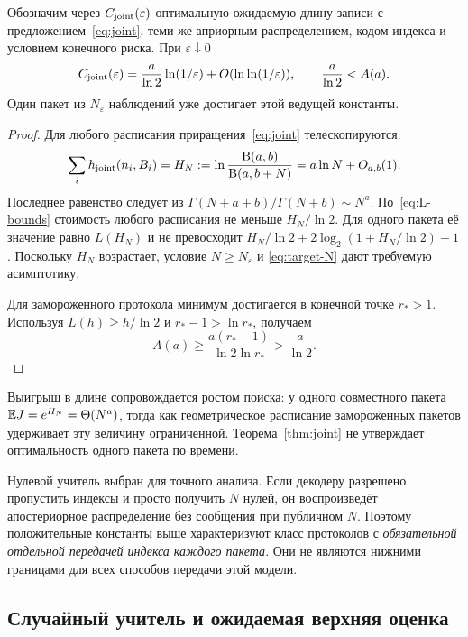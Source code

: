 \begin{theorem}
\label{thm:joint}
Обозначим через $C_{\rm joint}(\varepsilon)$ оптимальную ожидаемую длину
записи с предложением~\eqref{eq:joint}, теми же априорным распределением,
кодом индекса и условием
конечного риска. При $\varepsilon\downarrow0$
\begin{equation}
 C_{\rm joint}(\varepsilon)=\frac a{\ln2}\ln(1/\varepsilon)
                  +O(\ln\ln(1/\varepsilon)),
 \qquad \frac a{\ln2}<A(a).
 \label{eq:joint-asymp}
\end{equation}
Один пакет из $N_\varepsilon$ наблюдений уже достигает этой ведущей константы.
\end{theorem}
\begin{proof}
Для любого расписания приращения~\eqref{eq:joint} телескопируются:
\[
 \sum_i h_{\rm joint}(n_i,B_i)=
 H_N:=\ln\frac{\mathrm B(a,b)}{\mathrm B(a,b+N)}
      =a\ln N+O_{a,b}(1).
\]
Последнее равенство следует из
$\Gamma(N+a+b)/\Gamma(N+b)\sim N^a$.
По~\eqref{eq:L-bounds} стоимость любого расписания не меньше $H_N/\ln2$.
Для одного пакета её значение равно $L(H_N)$ и не превосходит
$H_N/\ln2+2\log_2(1+H_N/\ln2)+1$.
Поскольку $H_N$ возрастает, условие $N\ge N_\varepsilon$ и
\eqref{eq:target-N} дают требуемую асимптотику.

Для замороженного протокола минимум достигается в конечной точке $r_*>1$.
Используя $L(h)\ge h/\ln2$ и $r_*-1>\ln r_*$, получаем
\[
 A(a)\ge\frac{a(r_*-1)}{\ln2\ln r_*}>\frac a{\ln2}.
\]
\end{proof}

Выигрыш в длине сопровождается ростом поиска: у одного совместного пакета
$\mathbb E J=e^{H_N}=\Theta(N^a)$, тогда как геометрическое расписание замороженных
пакетов удерживает эту величину ограниченной. Теорема~\ref{thm:joint}
не утверждает оптимальность одного пакета по времени.

\begin{remark}
Нулевой учитель выбран для точного анализа. Если декодеру разрешено пропустить
индексы и просто получить $N$ нулей, он воспроизведёт апостериорное распределение без сообщения
при публичном $N$. Поэтому положительные константы выше характеризуют класс
протоколов с \emph{обязательной отдельной передачей индекса каждого пакета}.
Они не являются нижними границами для всех способов передачи этой модели.
\end{remark}

\subsection{Случайный учитель и ожидаемая верхняя оценка}

